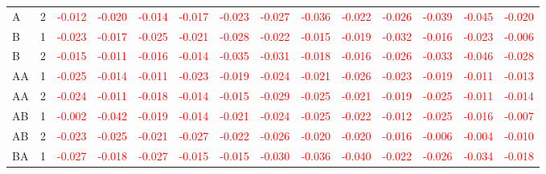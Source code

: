 \begin{table}[!htb]
{\begin{tabular}{llcccccccccccc}
A & 2 & \textcolor{red}{-0.012} & \textcolor{red}{-0.020} & \textcolor{red}{-0.014} & \textcolor{red}{-0.017} & \textcolor{red}{-0.023} & \textcolor{red}{-0.027} & \textcolor{red}{-0.036} & \textcolor{red}{-0.022} & \textcolor{red}{-0.026} & \textcolor{red}{-0.039} & \textcolor{red}{-0.045} & \textcolor{red}{-0.020}\\
B & 1 & \textcolor{red}{-0.023} & \textcolor{red}{-0.017} & \textcolor{red}{-0.025} & \textcolor{red}{-0.021} & \textcolor{red}{-0.028} & \textcolor{red}{-0.022} & \textcolor{red}{-0.015} & \textcolor{red}{-0.019} & \textcolor{red}{-0.032} & \textcolor{red}{-0.016} & \textcolor{red}{-0.023} & \textcolor{red}{-0.006}\\
B & 2 & \textcolor{red}{-0.015} & \textcolor{red}{-0.011} & \textcolor{red}{-0.016} & \textcolor{red}{-0.014} & \textcolor{red}{-0.035} & \textcolor{red}{-0.031} & \textcolor{red}{-0.018} & \textcolor{red}{-0.016} & \textcolor{red}{-0.026} & \textcolor{red}{-0.033} & \textcolor{red}{-0.046} & \textcolor{red}{-0.028}\\
AA & 1 & \textcolor{red}{-0.025} & \textcolor{red}{-0.014} & \textcolor{red}{-0.011} & \textcolor{red}{-0.023} & \textcolor{red}{-0.019} & \textcolor{red}{-0.024} & \textcolor{red}{-0.021} & \textcolor{red}{-0.026} & \textcolor{red}{-0.023} & \textcolor{red}{-0.019} & \textcolor{red}{-0.011} & \textcolor{red}{-0.013}\\
AA & 2 & \textcolor{red}{-0.024} & \textcolor{red}{-0.011} & \textcolor{red}{-0.018} & \textcolor{red}{-0.014} & \textcolor{red}{-0.015} & \textcolor{red}{-0.029} & \textcolor{red}{-0.025} & \textcolor{red}{-0.021} & \textcolor{red}{-0.019} & \textcolor{red}{-0.025} & \textcolor{red}{-0.011} & \textcolor{red}{-0.014}\\
AB & 1 & \textcolor{red}{-0.002} & \textcolor{red}{-0.042} & \textcolor{red}{-0.019} & \textcolor{red}{-0.014} & \textcolor{red}{-0.021} & \textcolor{red}{-0.024} & \textcolor{red}{-0.025} & \textcolor{red}{-0.022} & \textcolor{red}{-0.012} & \textcolor{red}{-0.025} & \textcolor{red}{-0.016} & \textcolor{red}{-0.007}\\
AB & 2 & \textcolor{red}{-0.023} & \textcolor{red}{-0.025} & \textcolor{red}{-0.021} & \textcolor{red}{-0.027} & \textcolor{red}{-0.022} & \textcolor{red}{-0.026} & \textcolor{red}{-0.020} & \textcolor{red}{-0.020} & \textcolor{red}{-0.016} & \textcolor{red}{-0.006} & \textcolor{red}{-0.004} & \textcolor{red}{-0.010}\\
BA & 1 & \textcolor{red}{-0.027} & \textcolor{red}{-0.018} & \textcolor{red}{-0.027} & \textcolor{red}{-0.015} & \textcolor{red}{-0.015} & \textcolor{red}{-0.030} & \textcolor{red}{-0.036} & \textcolor{red}{-0.040} & \textcolor{red}{-0.022} & \textcolor{red}{-0.026} & \textcolor{red}{-0.034} & \textcolor{red}{-0.018}\\

\end{tabular}}
\end{table}
